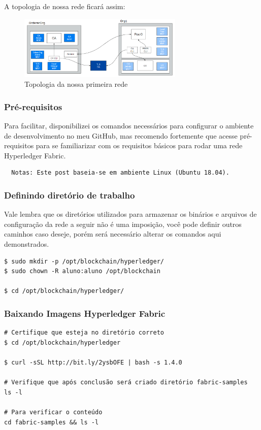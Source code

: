 \documentclass[a4paper,11pt]{article}
\begin{document}
A topologia de nossa rede ficará assim:
\begin{figure}[H]
	\centering
	\includegraphics[width=0.7\textwidth]{imagens/primeira-rede.png}
	\caption{Topologia da nossa primeira rede}
\end{figure}

\subsubsection{Pré-requisitos}
Para facilitar, disponibilizei os comandos necessários para configurar o ambiente de desenvolvimento no meu GitHub\cite{configuracaodeambiente}, mas recomendo fortemente que acesse pré-requisitos\cite{prerequisitos} para se familiarizar com os requisitos básicos para rodar uma rede Hyperledger Fabric.

\begin{lstlisting}
  Notas: Este post baseia-se em ambiente Linux (Ubuntu 18.04).
\end{lstlisting}

\subsubsection{Definindo diretório de trabalho}
Vale lembra que os diretórios utilizados para armazenar os binários e arquivos de configuração da rede a seguir não é uma imposição, você pode definir outros caminhos caso deseje, porém será necessário alterar os comandos aqui demonstrados.

\begin{lstlisting}
$ sudo mkdir -p /opt/blockchain/hyperledger/
$ sudo chown -R aluno:aluno /opt/blockchain

$ cd /opt/blockchain/hyperledger/
\end{lstlisting}

\subsubsection{Baixando Imagens Hyperledger Fabric}
\begin{lstlisting}
# Certifique que esteja no diretório correto
$ cd /opt/blockchain/hyperledger

$ curl -sSL http://bit.ly/2ysbOFE | bash -s 1.4.0

# Verifique que após conclusão será criado diretório fabric-samples
ls -l

# Para verificar o conteúdo
cd fabric-samples && ls -l
\end{lstlisting}
\end{document}
